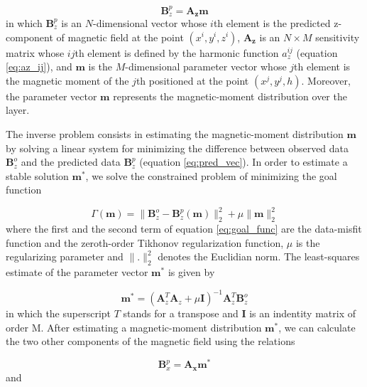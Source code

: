 \begin{equation}
\mathbf{B}_{z}^{p}  = \mathbf{A_z} \mathbf{m}
\label{eq:pred_vec}
\end{equation}
in which $\mathbf{B}_{z}^{p}$ is an $N$-dimensional vector whose $i$th element is the predicted z-component of magnetic field at the point $(x^i,y^i,z^i)$, $\mathbf{A_z} $ is an $N \times M$ sensitivity matrix whose $ij$th element is defined by the harmonic function $a_z^{ij}$ (equation \ref*{eq:az_ij}), and $\mathbf{m}$ is the $M$-dimensional parameter vector whose $j$th element is the magnetic moment of the $j$th positioned at the point $(x^j,y^j,h)$. Moreover, the parameter vector $\mathbf{m}$ represents the magnetic-moment distribution over the layer.

The inverse problem consists in estimating the magnetic-moment distribution $\mathbf{m}$ by solving a linear system for minimizing the difference between observed data $\mathbf{B}_z^o$ and the predicted data $\mathbf{B}_{z}^{p}$ (equation \ref*{eq:pred_vec}). In order to estimate a stable solution $\mathbf{m}^\ast$, we solve the constrained problem of minimizing the goal function

\begin{equation}
\Gamma (\mathbf{m}) = \parallel \mathbf{B}_{z}^{o} - \mathbf{B}_{z}^{p}(\mathbf{m}) \parallel_2^2 + \mu \parallel \mathbf{m} \parallel_2^2
\label{eq:goal_func}
\end{equation}
where the first and the second term of equation \ref*{eq:goal_func} are the data-misfit function and the zeroth-order Tikhonov regularization function, $\mu$ is the regularizing parameter and $\parallel . \parallel_2^2$ denotes the Euclidian norm. The least-squares estimate of the parameter vector $\mathbf{m}^\ast$ is given by 

\begin{equation}
	\mathbf{m}^\ast = \left( \mathbf{A}_z^T \mathbf{A}_z + \mu \mathbf{I} \right)^{-1} \mathbf{A}_z^T \mathbf{B}_z^o
\label{eq:ls_estimator}
\end{equation}
in which the superscript $T$ stands for a transpose and $\mathbf{I}$ is an indentity matrix of order M. After estimating a magnetic-moment distribution $\mathbf{m}^\ast$, we can calculate the two other components of the magnetic field using the relations 

\begin{equation}
\mathbf{B}_{x}^{p}  = \mathbf{A_x} \mathbf{m}^\ast
\label{eq:pred_vec_x}
\end{equation}
and 

